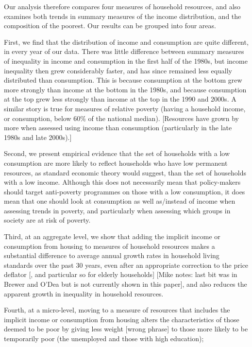 Our analysis therefore compares four measures of household resources, and also examines both trends in summary measures of the income distribution, and the composition of the poorest. Our results can be grouped into four areas. 

First, we find that the distribution of income and consumption are quite different, in every year of our data. There was little difference between summary measures of inequality in income and consumption in the first half of the 1980s, but income inequality then grew considerably faster, and has since remained less equally distributed than consumption. This is because  consumption at the bottom grew more strongly than income at the bottom in the 1980s, and because consumption at the top grew less strongly than income at the top in the 1990 and 2000s. A similar story is true for measures of relative poverty (having a household income, or consumption, below 60\% of the national median). [Resources have grown by more when assessed using income than consumption (particularly in the late 1980s and late 2000s).]  

Second, we present empirical evidence that the set of households with a low consumption are more likely to reflect households who have low permanent resources, as standard economic theory would suggest, than the set of households with a low income. Although this does not necessarily mean that policy-makers should target anti-poverty programmes on those with a low consumption, it does mean that one should look at consumption as well as/instead of income when assessing trends in poverty, and particularly when assessing which groups in society are at risk of poverty. 

Third, at an aggregate level, we show that adding the implicit income or consumption from housing to measures of household resources makes a substantial difference to average annual growth rates in household living standards over the past 30 years, even after an appropriate correction to the price deflator [, and particular so for elderly households] [Mike notes: last bit was in Brewer and O'Dea but is not currently shown in this paper], and also reduces the apparent growth in inequality in household resources.

Fourth, at a micro-level, moving to a measure of resources that includes the implicit income or consumption from housing alters the characteristics of those deemed to be poor by giving less weight [wrong phrase] to those more likely to be temporarily poor (the unemployed and those with high education);


